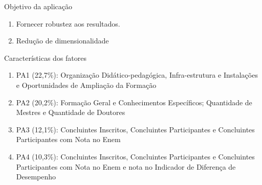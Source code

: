 \documentclass{beamer}
\begin{document}
\begin{frame}{Objetivo da aplicação}
	\begin{enumerate}
		\item Fornecer robustez aos resultados.
		\item Redução de dimensionalidade
	\end{enumerate}
\end{frame}

\begin{frame}{Características dos fatores}
	\begin{enumerate}
	\item PA1 (22,7\%): Organização Didático-pedagógica, Infra-estrutura e Instalações e Oportunidades de Ampliação da Formação
	\item PA2 (20,2\%): Formação Geral e Conhecimentos Específicos; Quantidade de Mestres e Quantidade de Doutores
	\item PA3 (12,1\%): Concluintes Inscritos, Concluintes Participantes e Concluintes Participantes com Nota no Enem
	\item PA4 (10,3\%): Concluintes Inscritos, Concluintes Participantes e Concluintes Participantes com Nota no Enem e nota no Indicador de Diferença de Desempenho
	\end{enumerate}
\end{frame}
\end{document}
